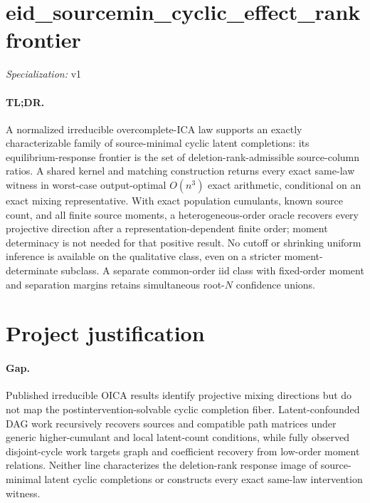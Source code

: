 \documentclass{article}
\begin{document}
\sloppy

\section*{eid\_\allowbreak{}sourcemin\_\allowbreak{}cyclic\_\allowbreak{}effect\_\allowbreak{}rankfrontier}

\noindent\textit{Specialization:} v1\par

\paragraph{TL;DR.} A normalized irreducible overcomplete-ICA law supports an exactly characterizable family of source-minimal cyclic latent completions: its equilibrium-response frontier is the set of deletion-rank-admissible source-column ratios. A shared kernel and matching construction returns every exact same-law witness in worst-case output-optimal \(O(n^3)\) exact arithmetic, conditional on an exact mixing representative. With exact population cumulants, known source count, and all finite source moments, a heterogeneous-order oracle recovers every projective direction after a representation-dependent finite order; moment determinacy is not needed for that positive result. No cutoff or shrinking uniform inference is available on the qualitative class, even on a stricter moment-determinate subclass. A separate common-order iid class with fixed-order moment and separation margins retains simultaneous root-\(N\) confidence unions.

\section{Project justification}

\paragraph{Gap.} Published irreducible OICA results identify projective mixing directions but do not map the postintervention-solvable cyclic completion fiber. Latent-confounded DAG work recursively recovers sources and compatible path matrices under generic higher-cumulant and local latent-count conditions, while fully observed disjoint-cycle work targets graph and coefficient recovery from low-order moment relations. Neither line characterizes the deletion-rank response image of source-minimal latent cyclic completions or constructs every exact same-law intervention witness.
\end{document}
